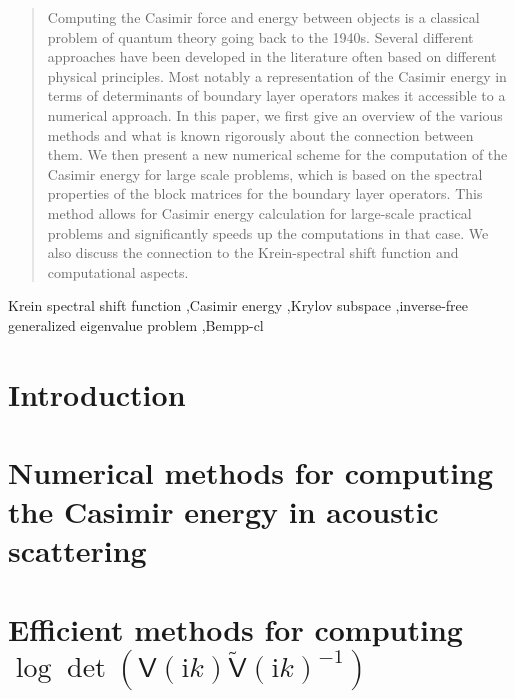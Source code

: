 \documentclass[review]{elsarticle}
\begin{document}
\begin{frontmatter}
\begin{abstract}
    Computing the Casimir force and energy between objects is a classical problem of quantum theory going back to the 1940s. Several different approaches have been developed in the literature often based on different physical principles. Most notably a representation of the Casimir energy in terms of determinants of boundary layer operators makes it accessible to a numerical approach. In this paper, we first give an overview of the various methods and what is known rigorously about the connection between them. We then present a new numerical scheme for the computation of the Casimir energy for large scale problems, which is based on the spectral properties of the block matrices for the boundary layer operators. This method allows for Casimir energy calculation for large-scale practical problems and significantly speeds up the computations in that case. We also discuss the connection to the Krein-spectral shift function and computational aspects.
   \end{abstract}

\begin{keyword}
Krein spectral shift function \sep Casimir energy \sep Krylov subspace \sep inverse-free generalized eigenvalue problem \sep Bempp-cl
\end{keyword}

\end{frontmatter}

\section{Introduction}\label{Introduction}


\section{Numerical methods for computing the Casimir energy  in acoustic scattering}\label{Numerical methods for computing the Casimir energy}


% 

\section{Efficient methods for computing $\log\det(\mathsf{V}(\mathrm{i}k)\tilde{\mathsf{V}}(\mathrm{i}k)^{-1})$}\label{Krylov subspace for generalized eigenvalue problem}

\end{document}
